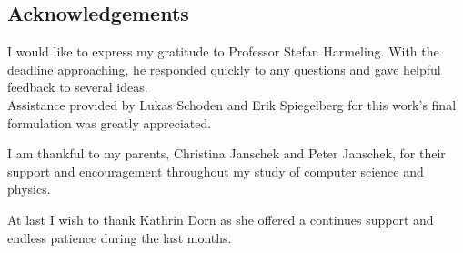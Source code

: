 \begin{titlepage}
\vspace*{\fill}
\section*{Acknowledgements}
I would like to express my gratitude to Professor Stefan Harmeling. With the deadline approaching, he responded quickly to any questions and gave helpful feedback to several ideas.\\
Assistance provided by Lukas Schoden and Erik Spiegelberg for this work's final formulation was greatly appreciated.

I am thankful to my parents, Christina Janschek and Peter Janschek, for their support and encouragement throughout my study of computer science and physics.

At last I wish to thank Kathrin Dorn as she offered a continues support and endless patience during the last months.

\vspace*{\fill}
\end{titlepage}
